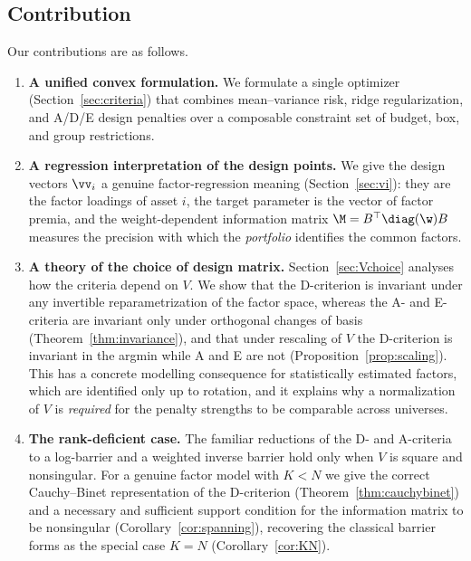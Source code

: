 \subsection{Contribution}
Our contributions are as follows.

\begin{enumerate}[leftmargin=1.6em,itemsep=0.3em]
  \item \textbf{A unified convex formulation.} We formulate a single optimizer
    (Section~\ref{sec:criteria}) that combines mean--variance risk, ridge
    regularization, and A/D/E design penalties over a composable constraint set
    of budget, box, and group restrictions.

  \item \textbf{A regression interpretation of the design points.} We give the
    design vectors $\vv_i$ a genuine factor-regression meaning
    (Section~\ref{sec:vi}): they are the factor loadings of asset $i$, the target
    parameter is the vector of factor premia, and the weight-dependent
    information matrix $\M=B^\top\diag(\w)B$ measures the precision with which the
    \emph{portfolio} identifies the common factors.

  \item \textbf{A theory of the choice of design matrix.} Section~\ref{sec:Vchoice}
    analyses how the criteria depend on $V$. We show that the D-criterion is
    invariant under any invertible reparametrization of the factor space, whereas
    the A- and E-criteria are invariant only under orthogonal changes of basis
    (Theorem~\ref{thm:invariance}), and that under rescaling of $V$ the D-criterion
    is invariant in the argmin while A and E are not
    (Proposition~\ref{prop:scaling}). This has a concrete modelling consequence
    for statistically estimated factors, which are identified only up to rotation,
    and it explains why a normalization of $V$ is \emph{required} for the penalty
    strengths to be comparable across universes.

  \item \textbf{The rank-deficient case.} The familiar reductions of the D- and
    A-criteria to a log-barrier and a weighted inverse barrier hold only when $V$
    is square and nonsingular. For a genuine factor model with $K<N$ we give the
    correct Cauchy--Binet representation of the D-criterion
    (Theorem~\ref{thm:cauchybinet}) and a necessary and sufficient support
    condition for the information matrix to be nonsingular
    (Corollary~\ref{cor:spanning}), recovering the classical barrier forms as the
    special case $K=N$ (Corollary~\ref{cor:KN}).


\end{enumerate}
